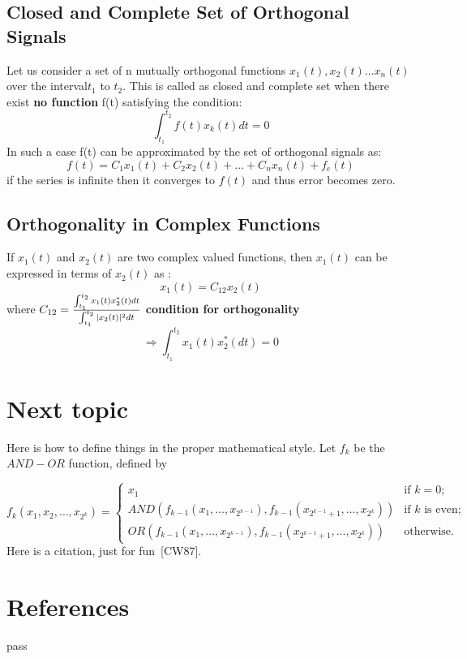 \documentclass[a4paper,12pt]{book}
\renewcommand{\cite}[1]{[#1]}
\begin{document}
\subsection{Closed and Complete Set of Orthogonal Signals}
Let us consider a set of n mutually orthogonal functions $x_1(t),x_2(t)...x_n(t)$ over the interval$t_1$ to $t_2$. This is called as closed and complete set when there exist {\bf no function} f(t) satisfying the condition:
$$\int_{t_1}^{t_2} f(t)x_k(t)dt = 0$$
In such a case f(t) can be approximated by the set of orthogonal signals as:
$$f(t) = C_1 x_1(t) + C_2 x_2(t) + ... + C_n x_n(t) + f_e(t)$$
if the series is infinite then it converges to $f(t)$ and thus error becomes zero.
\subsection{Orthogonality in Complex Functions}
If $x_1(t)$ and $x_2(t)$ are two complex valued functions, then $x_1(t)$ can be expressed in terms of $x_2(t)$ as :
$$x_1(t) = C_{12}x_2(t)$$
where $C_{12} = {{\int_{t_1}^{t_2} x_1(t)x_2^*(t)dt} \over { \int_{t_1}^{t_2} |x_2(t)|^2 dt}}$
{\bf condition for orthogonality}\\
$$\Rightarrow  \int_{t_1}^{t_2} x_1 (t) x_2^* (dt) = 0$$
\section{Next topic}
\begingroup
\centering


Here is how to define things in the proper mathematical style.
Let $f_k$ be the $AND-OR$ function, defined by

\[ f_k(x_1, x_2, \ldots, x_{2^k}) = \left\{ \begin{array}{ll}

	x_1 & \mbox{if $k = 0$;} \\

	AND(f_{k-1}(x_1, \ldots, x_{2^{k-1}}),
	   f_{k-1}(x_{2^{k-1} + 1}, \ldots, x_{2^k}))
	 & \mbox{if $k$ is even;} \\

	OR(f_{k-1}(x_1, \ldots, x_{2^{k-1}}),
	   f_{k-1}(x_{2^{k-1} + 1}, \ldots, x_{2^k}))	
	& \mbox{otherwise.} 
	\end{array}
	\right. \]
Here is a citation, just for fun~\cite{CW87}.
\section*{References}
pass
\endgroup
\end{document}
